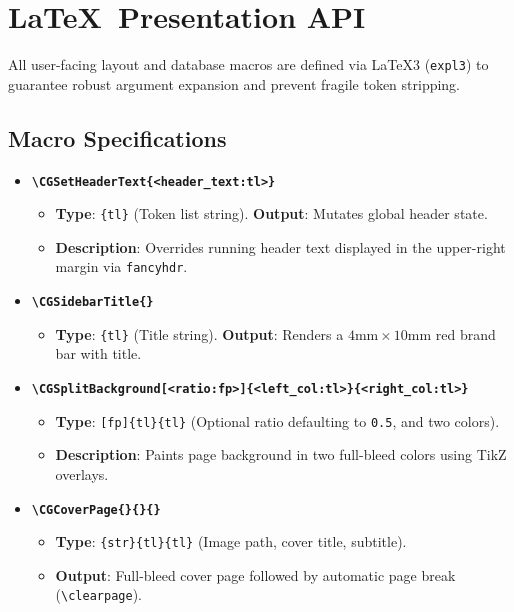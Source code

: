 \clearpage
\section{\LaTeX\ Presentation API}

All user-facing layout and database macros are defined via \LaTeX3 (\texttt{expl3}) to guarantee robust argument expansion and prevent fragile token stripping.

\subsection{Macro Specifications}

\begin{sloppypar}
{\small
\begin{itemize}
    \item \textbf{\texttt{\textbackslash CGSetHeaderText\{<header\_text:tl>\}}}
    \begin{itemize}
        \item \textbf{Type}: \texttt{\{tl\}} (Token list string). \textbf{Output}: Mutates global header state.
        \item \textbf{Description}: Overrides running header text displayed in the upper-right margin via \texttt{fancyhdr}.
    \end{itemize}

    \item \textbf{\texttt{\textbackslash CGSidebarTitle\{<title:tl>\}}}
    \begin{itemize}
        \item \textbf{Type}: \texttt{\{tl\}} (Title string). \textbf{Output}: Renders a $4\text{mm} \times 10\text{mm}$ red brand bar with title.
    \end{itemize}

    \item \textbf{\texttt{\textbackslash CGSplitBackground[<ratio:fp>]\{<left\_col:tl>\}\{<right\_col:tl>\}}}
    \begin{itemize}
        \item \textbf{Type}: \texttt{[fp]\{tl\}\{tl\}} (Optional ratio defaulting to \texttt{0.5}, and two colors).
        \item \textbf{Description}: Paints page background in two full-bleed colors using TikZ overlays.
    \end{itemize}

    \item \textbf{\texttt{\textbackslash CGCoverPage\{<image:str>\}\{<title:tl>\}\{<subtitle:tl>\}}}
    \begin{itemize}
        \item \textbf{Type}: \texttt{\{str\}\{tl\}\{tl\}} (Image path, cover title, subtitle).
        \item \textbf{Output}: Full-bleed cover page followed by automatic page break (\texttt{\textbackslash clearpage}).
    \end{itemize}


\end{itemize}}
\end{sloppypar}
